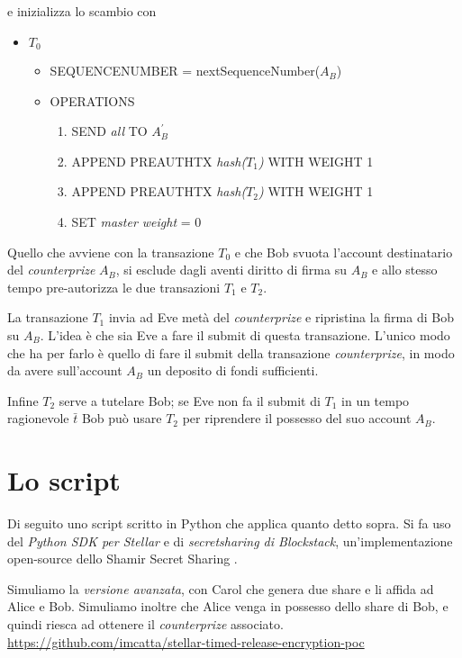 e inizializza lo scambio con
\begin{itemize}
	\item $ T_0 $
	      \begin{itemize}
		      \item SEQUENCE\textunderscore NUMBER = nextSequenceNumber($ A_B $)
		      \item OPERATIONS
		            \begin{enumerate}
			            \item SEND \textit{all} TO $ A_B^{\prime} $
			            \item APPEND PRE\textunderscore AUTH\textunderscore TX
			                  \textit{hash($ T_{1} $)} WITH WEIGHT 1
			            \item APPEND PRE\textunderscore AUTH\textunderscore TX
			                  \textit{hash($ T_{2} $)} WITH WEIGHT 1
			            \item SET \textit{master weight} = 0
		            \end{enumerate}
	      \end{itemize}
\end{itemize}

Quello che avviene con la transazione $ T_0 $ e che
Bob svuota l'account destinatario del \textit{counterprize} $ A_B $, si esclude
dagli aventi diritto di firma su $ A_B $ e allo stesso tempo pre-autorizza
le due transazioni $ T_1 $ e $ T_2 $.

La transazione $ T_1 $ invia ad Eve metà del \textit{counterprize}
e ripristina la firma di Bob su $ A_B $.
L'idea è che sia Eve a fare il submit di questa transazione. L'unico modo che ha per
farlo è quello di fare il submit della transazione \textit{counterprize}, in modo da avere
sull'account $ A_B $ un deposito di fondi sufficienti.

Infine $ T_2 $ serve a tutelare Bob; se Eve non fa il submit di $ T_{1} $ in un tempo ragionevole
$ \bar{t} $ Bob può usare $ T_2 $ per riprendere il possesso del suo account $ A_B $.


\section{Lo script}
Di seguito uno script scritto in Python che applica quanto detto sopra.
Si fa uso del \textit{Python SDK per Stellar} e di
\textit{secretsharing di Blockstack}, un'implementazione open-source dello
Shamir Secret Sharing \cite{Shamir:1979:SS:359168.359176}.

Simuliamo la \textit{versione avanzata}, con Carol che genera due share e li
affida ad Alice e Bob.
Simuliamo inoltre che Alice venga in possesso dello share di Bob, e quindi riesca ad
ottenere il \textit{counterprize} associato.
\\
\url{https://github.com/imcatta/stellar-timed-release-encryption-poc}